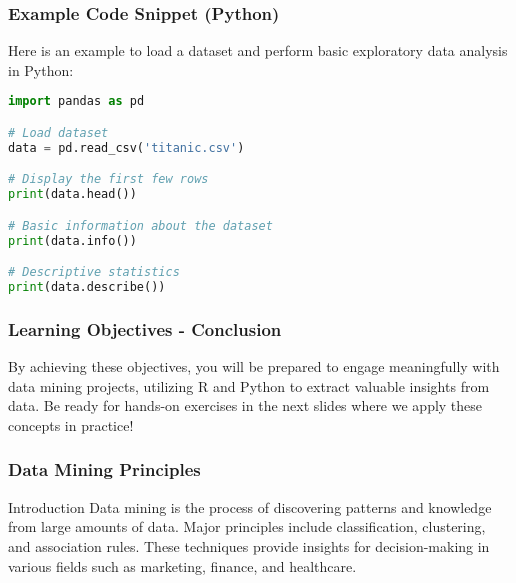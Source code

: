 \documentclass[aspectratio=169]{beamer}
\begin{document}
\begin{frame}[fragile]
    \frametitle{Example Code Snippet (Python)}
    Here is an example to load a dataset and perform basic exploratory data analysis in Python:
    \begin{lstlisting}[language=Python]
import pandas as pd

# Load dataset
data = pd.read_csv('titanic.csv')

# Display the first few rows
print(data.head())

# Basic information about the dataset
print(data.info())

# Descriptive statistics
print(data.describe())
    \end{lstlisting}
\end{frame}

\begin{frame}[fragile]
    \frametitle{Learning Objectives - Conclusion}
    By achieving these objectives, you will be prepared to engage meaningfully with data mining projects, utilizing R and Python to extract valuable insights from data. Be ready for hands-on exercises in the next slides where we apply these concepts in practice!
\end{frame}

\begin{frame}[fragile]
    \frametitle{Data Mining Principles}
    \begin{block}{Introduction}
        Data mining is the process of discovering patterns and knowledge from large amounts of data. Major principles include classification, clustering, and association rules. These techniques provide insights for decision-making in various fields such as marketing, finance, and healthcare.
    \end{block}
\end{frame}
\end{document}
